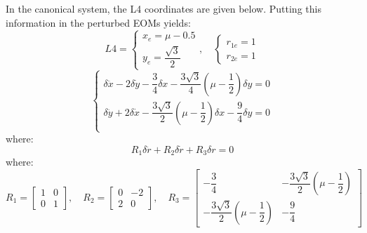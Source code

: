 In the canonical system, the L4 coordinates are given below. Putting this information in the perturbed EOMs yields:
\begin{equation}
    L4 = \begin{cases}
        x_e = \mu - 0.5\\
        y_e = \dfrac{\sqrt{3}}{2}
    \end{cases}, \quad \begin{cases}
        r_{1e} = 1\\
        r_{2e} = 1
    \end{cases}
\end{equation}
\begin{equation}
    \begin{cases}
        \delta \ddot{x} - 2\delta \dot{y} - \dfrac{3}{4}\delta x - \dfrac{3\sqrt{3}}{4} \left(\mu-\dfrac{1}{2}\right)\delta y = 0\\
        \delta \ddot{y} + 2\delta \dot{x} - \dfrac{3\sqrt{3}}{2}\left(\mu-\dfrac{1}{2}\right)\delta x - \dfrac{9}{4}\delta y = 0\\
    \end{cases}
\end{equation}
where:
\begin{equation}
    R_1\delta \ddot{r} + R_2\delta \dot{r} + R_3\delta r = 0
\end{equation}
where:
\begin{equation}
    R_1 = \begin{bmatrix}
        1 & 0\\
        0 & 1 \end{bmatrix}, \quad R_2 = \begin{bmatrix}
        0 & -2\\
        2 & 0 \end{bmatrix}, \quad R_3 = \begin{bmatrix}
        -\dfrac{3}{4} & -\dfrac{3\sqrt{3}}{2}\left(\mu-\dfrac{1}{2}\right)\\
        -\dfrac{3\sqrt{3}}{2}\left(\mu-\dfrac{1}{2}\right) & -\dfrac{9}{4} \end{bmatrix}
\end{equation}

